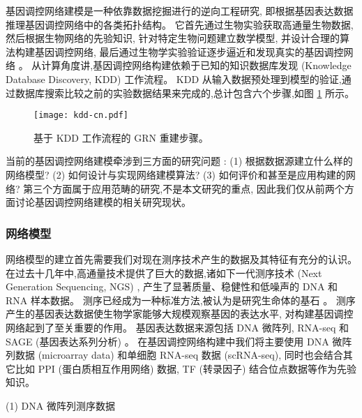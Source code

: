 基因调控网络建模是一种依靠数据挖掘进行的逆向工程研究, 即根据基因表达数据推理基因调控网络中的各类拓扑结构。
它首先通过生物实验获取高通量生物数据, 然后根据生物网络的先验知识, 针对特定生物问题建立数学模型, 
并设计合理的算法构建基因调控网络, 最后通过生物学实验验证逐步逼近和发现真实的基因调控网络 \cite{sima2009inference}。
从计算角度讲,基因调控网络构建依赖于已知的知识数据库发现 (Knowledge Database Discovery, KDD) 工作流程。
KDD 从输入数据预处理到模型的验证,通过数据库搜索比较之前的实验数据结果来完成的,总计包含六个步骤,如图 \ref{cover-3} 所示。
\begin{figure}[!htbp]
    \centering
    \texttt{[image: kdd-cn.pdf]}
    \caption{基于 KDD 工作流程的 GRN 重建步骤。}
    \label{cover-3}
\end{figure}

当前的基因调控网络建模牵涉到三方面的研究问题 \cite{schlitt2007current}:
(1) 根据数据源建立什么样的网络模型?
(2) 如何设计与实现网络建模算法?
(3) 如何评价和甚至是应用构建的网络?
第三个方面属于应用范畴的研究,不是本文研究的重点, 因此我们仅从前两个方面讨论基因调控网络建模的相关研究现状。

\subsubsection{网络模型}

网络模型的建立首先需要我们对现在测序技术产生的数据及其特征有充分的认识。
在过去十几年中,高通量技术提供了巨大的数据,诸如下一代测序技术 (Next Generation Sequencing, NGS) \cite{BUERMANS20141932}, 
产生了显著质量、稳健性和低噪声的 DNA 和 RNA 样本数据。
测序已经成为一种标准方法,被认为是研究生命体的基石 \cite{CEREB2015923}。
测序产生的基因表达数据使生物学家能够大规模观察基因的表达水平, 对构建基因调控网络起到了至关重要的作用。
基因表达数据来源包括 DNA 微阵列, RNA-seq \cite{morin2008profiling}和 SAGE (基因表达系列分析) \cite{velculescu1995serial}。
在基因调控网络构建中我们将主要使用 DNA 微阵列数据 (microarray data) 和单细胞 RNA-seq 数据 (scRNA-seq),
同时也会结合其它比如 PPI (蛋白质相互作用网络) 数据, TF (转录因子) 结合位点数据等作为先验知识。

(1) DNA 微阵列测序数据


